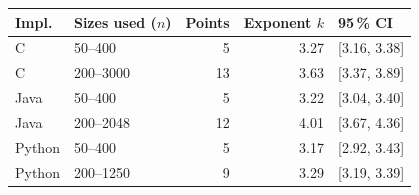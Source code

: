 \begin{tabular}{llrrl}
\toprule
Impl. & Sizes used ($n$) & Points & Exponent $k$ & 95\,\% CI \\
\midrule
C & 50--400 & 5 & 3.27 & [3.16, 3.38] \\
C & 200--3000 & 13 & 3.63 & [3.37, 3.89] \\
Java & 50--400 & 5 & 3.22 & [3.04, 3.40] \\
Java & 200--2048 & 12 & 4.01 & [3.67, 4.36] \\
Python & 50--400 & 5 & 3.17 & [2.92, 3.43] \\
Python & 200--1250 & 9 & 3.29 & [3.19, 3.39] \\
\bottomrule
\end{tabular}
